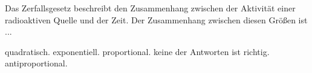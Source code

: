 \documentclass[11pt]{exam}
\begin{document}
\begin{questions}
\vspace{3mm}\question Das Zerfallsgesetz beschreibt den Zusammenhang zwischen der Aktivität einer radioaktiven Quelle und der Zeit. Der Zusammenhang zwischen diesen Größen ist ...

\begin{choices}
	\choice quadratisch.
	\choice exponentiell.
	\choice proportional.
	\choice keine der Antworten ist richtig.
	\choice antiproportional.
\end{choices}

\vspace{3mm}\end{questions}
\end{document}
